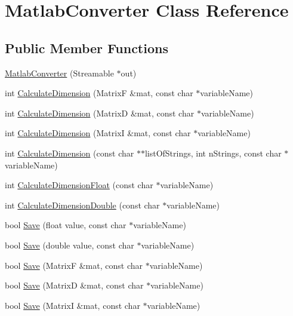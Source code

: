 \hypertarget{classMatlabConverter}{
\section{MatlabConverter Class Reference}
\label{classMatlabConverter}
}
\subsection*{Public Member Functions}
\begin{DoxyCompactItemize}
\item 
\hyperlink{classMatlabConverter_ae231df5f9ce670b05ad9025084e7ee48}{MatlabConverter} (Streamable $\ast$out)
\item 
int \hyperlink{classMatlabConverter_a41c2cbd92d7f8c9ad4f5f2cff09ba3c6}{CalculateDimension} (MatrixF \&mat, const char $\ast$variableName)
\item 
int \hyperlink{classMatlabConverter_aaf250197b07b0ea5c03b5227736947ee}{CalculateDimension} (MatrixD \&mat, const char $\ast$variableName)
\item 
int \hyperlink{classMatlabConverter_ae19203f53f8ec927af2c949f2f59b194}{CalculateDimension} (MatrixI \&mat, const char $\ast$variableName)
\item 
int \hyperlink{classMatlabConverter_a4abba9a7dd19d6b3c66934c2448c3825}{CalculateDimension} (const char $\ast$$\ast$listOfStrings, int nStrings, const char $\ast$variableName)
\item 
int \hyperlink{classMatlabConverter_a0eec9381ea2acc2fc13bd1c8fdac680c}{CalculateDimensionFloat} (const char $\ast$variableName)
\item 
int \hyperlink{classMatlabConverter_ade1e325d7a5ecc800959631d424431d2}{CalculateDimensionDouble} (const char $\ast$variableName)
\item 
bool \hyperlink{classMatlabConverter_a5d72106d3b7ae4cfa2c4109b18b8bd17}{Save} (float value, const char $\ast$variableName)
\item 
bool \hyperlink{classMatlabConverter_afa0e6c9e09a491717d5229e4b08d15b0}{Save} (double value, const char $\ast$variableName)
\item 
bool \hyperlink{classMatlabConverter_aa02883e0f36920d6e5baa1acafe48b2f}{Save} (MatrixF \&mat, const char $\ast$variableName)
\item 
bool \hyperlink{classMatlabConverter_a98c7d90bf3257d2ab9737b8823570b0f}{Save} (MatrixD \&mat, const char $\ast$variableName)
\item 
bool \hyperlink{classMatlabConverter_a1b7aaf580f2edfea7d41ac1d8ffd8d39}{Save} (MatrixI \&mat, const char $\ast$variableName)
$$
\end{DoxyCompactItemize}
